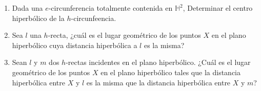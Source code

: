 \documentclass[11pt]{report}
\numberwithin{section}{chapter}
\newcommand{\h}{\mathbb H}
\begin{document}
\begin{enumerate}
\item Dada una $e$-circunferencia totalmente contenida en $\h^2$, Determinar el centro hiperbólico de la  $h$-circunfeencia.


\item Sea $l$ una $h$-recta, ¿cuál es el lugar geométrico de los puntos $X$ en el plano hiperbólico cuya distancia hiperbólica a $l$ es la misma?

\item Sean $l$ y $m$  dos $h$-rectas incidentes en el plano hiperbólico. ¿Cuál es el lugar geométrico de los puntos $X$ en el plano hiperbólico tales que la distancia hiperbólica entre $X$ y $l$ es la misma que la distancia hiperbólica entre $X$ y $m$? 



\end{enumerate}
\end{document}
